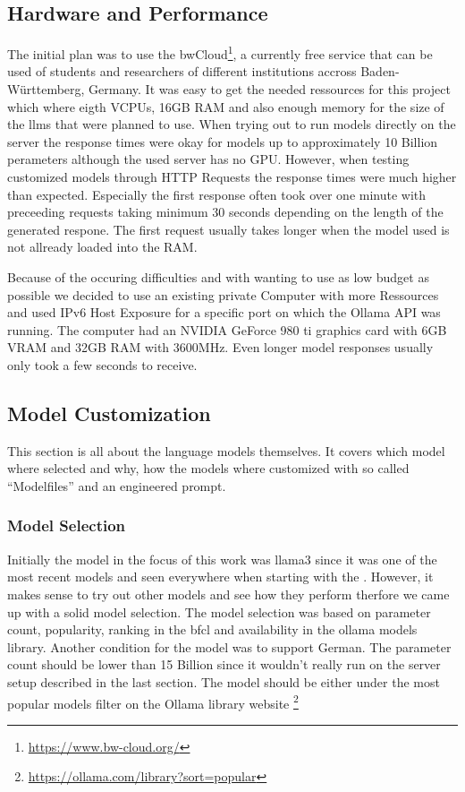 \subsection{Hardware and Performance}
The initial plan was to use the bwCloud\footnote{\url{https://www.bw-cloud.org/}}, a currently free service that can be used of students and researchers of different institutions accross Baden-Württemberg, Germany.
It was easy to get the needed ressources for this project which where eigth VCPUs, 16GB RAM and also enough memory for the size of the \glspl{llm} that were planned to use.
When trying out to run models directly on the server the response times were okay for models up to approximately 10 Billion perameters although the used server has no GPU.
However, when testing customized models through HTTP Requests the response times were much higher than expected.
Especially the first response often took over one minute with preceeding requests taking minimum 30 seconds depending on the length of the generated respone.
The first request usually takes longer when the model used is not allready loaded into the RAM.

Because of the occuring difficulties and with wanting to use as low budget as possible we decided to use an existing private Computer with more Ressources and used IPv6 Host Exposure for a specific port on which the Ollama API was running.
The computer had an NVIDIA GeForce 980 ti graphics card with 6GB VRAM and 32GB RAM with 3600MHz.
Even longer model responses usually only took a few seconds to receive.

\subsection{Model Customization}
This section is all about the language models themselves. It covers which model where selected and why, how the models where customized with so called ``Modelfiles'' and an engineered prompt.
\subsubsection{Model Selection}
Initially the model in the focus of this work was llama3 since it was one of the most recent models and seen everywhere when starting with the .
However, it makes sense to try out other models and see how they perform therfore we came up with a solid model selection.
The model selection was based on parameter count, popularity, ranking in the \gls{bfcl} and availability in the ollama models library.
Another condition for the model was to support German.
The parameter count should be lower than 15 Billion since it wouldn't really run on the server setup described in the last section.
The model should be either under the most popular models filter on the Ollama library website \footnote{\url{https://ollama.com/library?sort=popular}}

